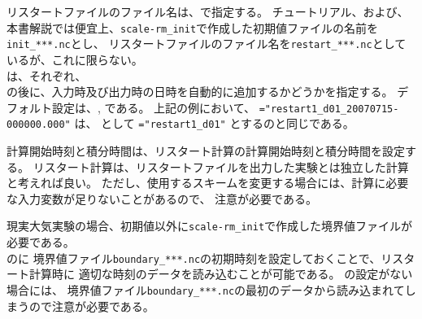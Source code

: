 リスタートファイルのファイル名は、で指定する。
チュートリアル、および、本書解説では便宜上、\verb|scale-rm_init|で作成した初期値ファイルの名前を\verb|init_***.nc|とし、
リスタートファイルのファイル名を\verb|restart_***.nc|としているが、これに限らない。\\
%
は、それぞれ、\\
の後に、入力時及び出力時の日時を自動的に追加するかどうかを指定する。
デフォルト設定は、, である。
上記の例において、 \verb|="restart1_d01_20070715-000000.000"| は、
として \verb|="restart1_d01"| とするのと同じである。


計算開始時刻と積分時間は、リスタート計算の計算開始時刻と積分時間を設定する。
リスタート計算は、リスタートファイルを出力した実験とは独立した計算と考えれば良い。
ただし、使用するスキームを変更する場合には、計算に必要な入力変数が足りないことがあるので、
注意が必要である。

現実大気実験の場合、初期値以外に\verb|scale-rm_init|で作成した境界値ファイルが必要である。\\
のに
境界値ファイル\verb|boundary_***.nc|の初期時刻を設定しておくことで、リスタート計算時に
適切な時刻のデータを読み込むことが可能である。
の設定がない場合には、
境界値ファイル\verb|boundary_***.nc|の最初のデータから読み込まれてしまうので注意が必要である。\\

\\


